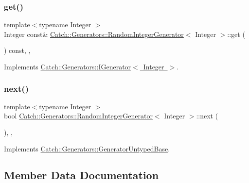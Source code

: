 \subsubsection{\texorpdfstring{get()}{get()}}
{\footnotesize\ttfamily template$<$typename Integer $>$ \\
Integer const\& \mbox{\hyperlink{class_catch_1_1_generators_1_1_random_integer_generator}{Catch\+::\+Generators\+::\+Random\+Integer\+Generator}}$<$ Integer $>$\+::get (\begin{DoxyParamCaption}{ }\end{DoxyParamCaption}) const\hspace{0.3cm}{\ttfamily [inline]}, {\ttfamily [override]}, {\ttfamily [virtual]}}



Implements \mbox{\hyperlink{struct_catch_1_1_generators_1_1_i_generator_a525d381fc9249a885b075a0632a8579a}{Catch\+::\+Generators\+::\+I\+Generator$<$ Integer $>$}}.

\mbox{\label{class_catch_1_1_generators_1_1_random_integer_generator_aaa3db70fbdfa3e8dcb61fb5592eba81f}} 
\subsubsection{\texorpdfstring{next()}{next()}}
{\footnotesize\ttfamily template$<$typename Integer $>$ \\
bool \mbox{\hyperlink{class_catch_1_1_generators_1_1_random_integer_generator}{Catch\+::\+Generators\+::\+Random\+Integer\+Generator}}$<$ Integer $>$\+::next (\begin{DoxyParamCaption}{ }\end{DoxyParamCaption})\hspace{0.3cm}{\ttfamily [inline]}, {\ttfamily [override]}, {\ttfamily [virtual]}}



Implements \mbox{\hyperlink{class_catch_1_1_generators_1_1_generator_untyped_base_aeed3c0cd6233c5f553549e453b8d6638}{Catch\+::\+Generators\+::\+Generator\+Untyped\+Base}}.



\subsection{Member Data Documentation}
\mbox{\label{class_catch_1_1_generators_1_1_random_integer_generator_a1b811ebf04416b6b822ce153b040f020}} 
